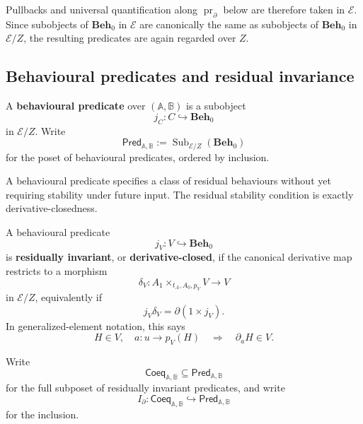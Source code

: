 Pullbacks and universal quantification along
\(\operatorname{pr}_{\partial}\) below are therefore taken in \(\mathcal E\).
Since subobjects of \(\mathbf{Beh}_0\) in \(\mathcal E\) are canonically the
same as subobjects of \(\mathbf{Beh}_0\) in \(\mathcal E/Z\), the resulting
predicates are again regarded over \(Z\).

\subsection{Behavioural predicates and residual invariance}
\label{subsec:behavioural-predicates-residual-invariance}

\begin{definition}
\label{def:behavioural-predicate}
    A \textbf{behavioural predicate} over \((\mathbb A,\mathbb B)\) is a
    subobject
    \[
        j_C:C\hookrightarrow\mathbf{Beh}_0
    \]
    in \(\mathcal E/Z\). Write
    \[
        \mathsf{Pred}_{\mathbb A,\mathbb B}
        :=
        \operatorname{Sub}_{\mathcal E/Z}(\mathbf{Beh}_0)
    \]
    for the poset of behavioural predicates, ordered by inclusion.
\end{definition}

A behavioural predicate specifies a class of residual behaviours without yet
requiring stability under future input. The residual stability condition is
exactly derivative-closedness.

\begin{definition}
\label{def:residual-invariance}
    A behavioural predicate
    \[
        j_V:V\hookrightarrow\mathbf{Beh}_0
    \]
    is \textbf{residually invariant}, or \textbf{derivative-closed}, if the
    canonical derivative map restricts to a morphism
    \[
        \delta_V:
        A_1\times_{t_A,A_0,p_V}V\to V
    \]
    in \(\mathcal E/Z\), equivalently if
    \[
        j_V\delta_V
        =
        \partial(1\times j_V).
    \]
    In generalized-element notation, this says
    \[
        H\in V,
        \quad
        a:u\to p_V(H)
        \quad\Longrightarrow\quad
        \partial_aH\in V.
    \]
\end{definition}

Write
\[
    \mathsf{Coeq}_{\mathbb A,\mathbb B}
    \subseteq
    \mathsf{Pred}_{\mathbb A,\mathbb B}
\]
for the full subposet of residually invariant predicates, and write
\[
    I_\partial:
    \mathsf{Coeq}_{\mathbb A,\mathbb B}
    \hookrightarrow
    \mathsf{Pred}_{\mathbb A,\mathbb B}
\]
for the inclusion.

